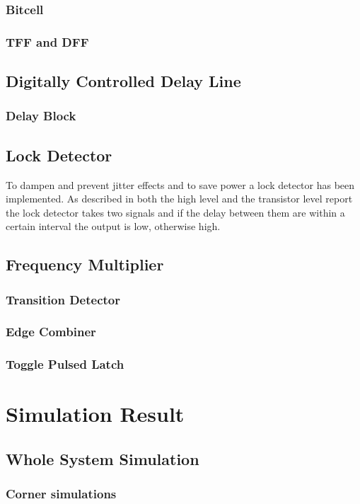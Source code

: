 \documentclass[a4paper,12pt]{article} \usepackage{graphicx}
\begin{document}
\subsubsection{Bitcell}
\subsubsection{TFF and DFF}
\subsection{Digitally Controlled Delay Line}
\subsubsection{Delay Block}
\subsection{Lock Detector}
To dampen and prevent jitter effects and to save power a lock detector
has been implemented. As described in both the high level and the
transistor level report the lock detector takes two signals and if
the delay between them are within a certain interval the output is
low, otherwise high.
\subsection{Frequency Multiplier}
\subsubsection{Transition Detector}
\subsubsection{Edge Combiner}
\subsubsection{Toggle Pulsed Latch}

\section{Simulation Result}
\subsection{Whole System Simulation}
\subsubsection{Corner simulations}
\end{document}
